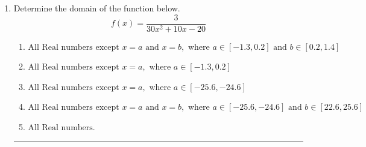 \documentclass[14pt]{extbook}
\newcommand{\litem}[1]{\item#1\hspace*{-1cm}\rule{\textwidth}{0.4pt}}
\begin{document}
\begin{enumerate}
{\begin{enumerate}[label=\Alph*.]
\end{enumerate} }
\litem{
Determine the domain of the function below.\[ f(x) = \frac{3}{30x^{2} +10 x -20} \]\begin{enumerate}[label=\Alph*.]
\item \( \text{All Real numbers except } x = a \text{ and } x = b, \text{ where } a \in [-1.3, 0.2] \text{ and } b \in [0.2, 1.4] \)
\item \( \text{All Real numbers except } x = a, \text{ where } a \in [-1.3, 0.2] \)
\item \( \text{All Real numbers except } x = a, \text{ where } a \in [-25.6, -24.6] \)
\item \( \text{All Real numbers except } x = a \text{ and } x = b, \text{ where } a \in [-25.6, -24.6] \text{ and } b \in [22.6, 25.6] \)
\item \( \text{All Real numbers.} \)


\end{enumerate}}
\end{enumerate}
\end{document}
